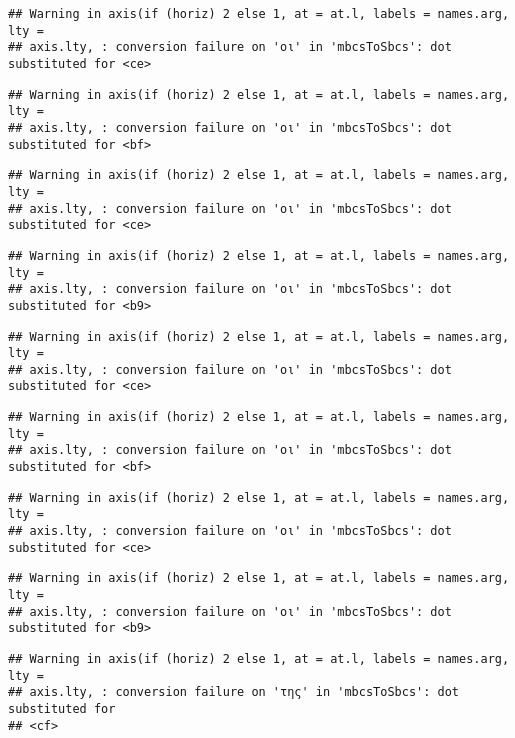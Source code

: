 \documentclass[
]{article}
\begin{document}
\begin{verbatim}
## Warning in axis(if (horiz) 2 else 1, at = at.l, labels = names.arg, lty =
## axis.lty, : conversion failure on 'οι' in 'mbcsToSbcs': dot substituted for <ce>
\end{verbatim}

\begin{verbatim}
## Warning in axis(if (horiz) 2 else 1, at = at.l, labels = names.arg, lty =
## axis.lty, : conversion failure on 'οι' in 'mbcsToSbcs': dot substituted for <bf>
\end{verbatim}

\begin{verbatim}
## Warning in axis(if (horiz) 2 else 1, at = at.l, labels = names.arg, lty =
## axis.lty, : conversion failure on 'οι' in 'mbcsToSbcs': dot substituted for <ce>
\end{verbatim}

\begin{verbatim}
## Warning in axis(if (horiz) 2 else 1, at = at.l, labels = names.arg, lty =
## axis.lty, : conversion failure on 'οι' in 'mbcsToSbcs': dot substituted for <b9>
\end{verbatim}

\begin{verbatim}
## Warning in axis(if (horiz) 2 else 1, at = at.l, labels = names.arg, lty =
## axis.lty, : conversion failure on 'οι' in 'mbcsToSbcs': dot substituted for <ce>
\end{verbatim}

\begin{verbatim}
## Warning in axis(if (horiz) 2 else 1, at = at.l, labels = names.arg, lty =
## axis.lty, : conversion failure on 'οι' in 'mbcsToSbcs': dot substituted for <bf>
\end{verbatim}

\begin{verbatim}
## Warning in axis(if (horiz) 2 else 1, at = at.l, labels = names.arg, lty =
## axis.lty, : conversion failure on 'οι' in 'mbcsToSbcs': dot substituted for <ce>
\end{verbatim}

\begin{verbatim}
## Warning in axis(if (horiz) 2 else 1, at = at.l, labels = names.arg, lty =
## axis.lty, : conversion failure on 'οι' in 'mbcsToSbcs': dot substituted for <b9>
\end{verbatim}

\begin{verbatim}
## Warning in axis(if (horiz) 2 else 1, at = at.l, labels = names.arg, lty =
## axis.lty, : conversion failure on 'της' in 'mbcsToSbcs': dot substituted for
## <cf>
\end{verbatim}
\end{document}
